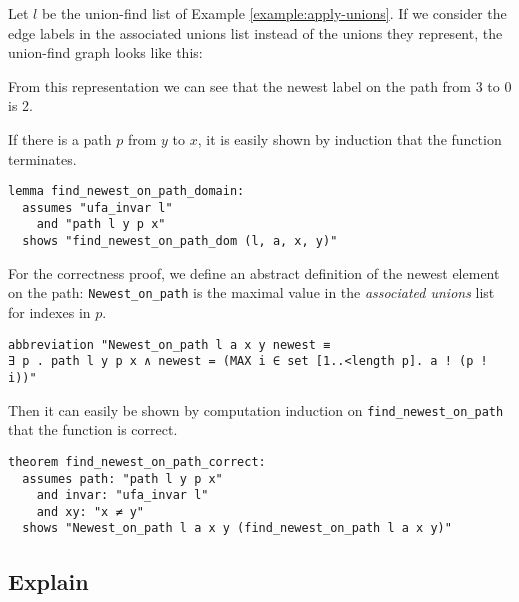 \begin{exmp}
Let $l$ be the union-find list of Example \ref{example:apply-unions}. If we consider the edge labels in the associated unions list instead of the unions they represent, the union-find graph looks like this:

\begin{center}
\end{center}

From this representation we can see that the newest label on the path from 3 to 0 is 2.
\end{exmp}

If there is a path $p$ from $y$ to $x$, it is easily shown by induction that the function terminates.

\begin{lstlisting}
lemma find_newest_on_path_domain:
  assumes "ufa_invar l"
    and "path l y p x"
  shows "find_newest_on_path_dom (l, a, x, y)"
\end{lstlisting}

For the correctness proof, we define an abstract definition of the newest element on the path: \lstinline{Newest_on_path} is the maximal value in the \emph{associated unions} list for indexes in $p$.

\begin{lstlisting}
abbreviation "Newest_on_path l a x y newest ≡
∃ p . path l y p x ∧ newest = (MAX i ∈ set [1..<length p]. a ! (p ! i))"
\end{lstlisting}

Then it can easily be shown by computation induction on \lstinline{find_newest_on_path} that the function is correct.

\begin{lstlisting}
theorem find_newest_on_path_correct:
  assumes path: "path l y p x"
    and invar: "ufa_invar l"
    and xy: "x ≠ y"
  shows "Newest_on_path l a x y (find_newest_on_path l a x y)"
\end{lstlisting}

\subsection{Explain}

